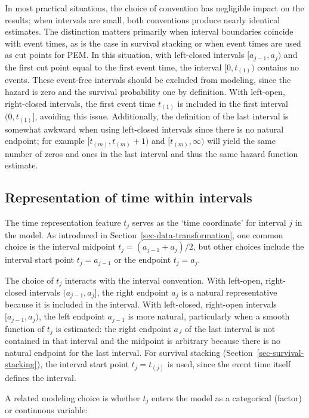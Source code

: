 \documentclass[
  letterpaper,
  krantz2]{style/krantz}
\begin{document}
In most practical situations, the choice of convention has negligible
impact on the results; when intervals are small, both conventions
produce nearly identical estimates. The distinction matters primarily
when interval boundaries coincide with event times, as is the case in
survival stacking or when event times are used as cut points for PEM. In
this situation, with left-closed intervals \([a_{j-1}, a_j)\) and the
first cut point equal to the first event time, the interval
\([0, t_{(1)})\) contains no events. These event-free intervals should
be excluded from modeling, since the hazard is zero and the survival
probability one by definition. With left-open, right-closed intervals,
the first event time \(t_{(1)}\) is included in the first interval
\((0, t_{(1)}]\), avoiding this issue. Additionally, the definition of
the last interval is somewhat awkward when using left-closed intervals
since there is no natural endpoint; for example \([t_{(m)}, t_{(m)}+1)\)
and \([t_{(m)}, \infty)\) will yield the same number of zeros and ones
in the last interval and thus the same hazard function estimate.

\subsection{Representation of time within
intervals}\label{sec-partition-timerep}

The time representation feature \(t_j\) serves as the `time coordinate'
for interval \(j\) in the model. As introduced in
Section~\ref{sec-data-transformation}, one common choice is the interval
midpoint \(t_j = (a_{j-1} + a_j)/2\), but other choices include the
interval start point \(t_j = a_{j-1}\) or the endpoint \(t_j = a_j\).

The choice of \(t_j\) interacts with the interval convention. With
left-open, right-closed intervals \((a_{j-1}, a_j]\), the right endpoint
\(a_j\) is a natural representative because it is included in the
interval. With left-closed, right-open intervals \([a_{j-1}, a_j)\), the
left endpoint \(a_{j-1}\) is more natural, particularly when a smooth
function of \(t_j\) is estimated: the right endpoint \(a_J\) of the last
interval is not contained in that interval and the midpoint is arbitrary
because there is no natural endpoint for the last interval. For survival
stacking (Section~\ref{sec-survival-stacking}), the interval start point
\(t_j = t_{(j)}\) is used, since the event time itself defines the
interval.

A related modeling choice is whether \(t_j\) enters the model as a
categorical (factor) or continuous variable:
\end{document}
